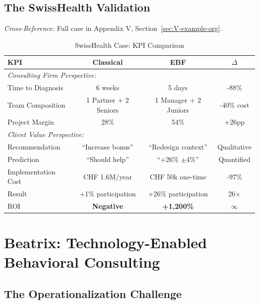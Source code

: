 \subsection{The SwissHealth Validation}

\textit{Cross-Reference:} Full case in Appendix V, Section~\ref{sec:V-example-org}.

\begin{table}[htbp]
\centering
\caption{SwissHealth Case: KPI Comparison}
\label{tab:swisshealth-kpis}
\renewcommand{\arraystretch}{1.3}
\begin{tabular}{@{}lccc@{}}
\toprule
\textbf{KPI} & \textbf{Classical} & \textbf{EBF} & \textbf{$\Delta$} \\
\midrule
\multicolumn{4}{l}{\textit{Consulting Firm Perspective:}} \\
Time to Diagnosis & 6 weeks & 5 days & -88\% \\
Team Composition & 1 Partner + 2 Seniors & 1 Manager + 2 Juniors & -40\% cost \\
Project Margin & 28\% & 54\% & +26pp \\
\midrule
\multicolumn{4}{l}{\textit{Client Value Perspective:}} \\
Recommendation & ``Increase bonus'' & ``Redesign context'' & Qualitative \\
Prediction & ``Should help'' & ``+26\% $\pm$4\%'' & Quantified \\
Implementation Cost & CHF 1.6M/year & CHF 50k one-time & -97\% \\
Result & +1\% participation & +26\% participation & 26$\times$ \\
ROI & \textbf{Negative} & \textbf{+1,200\%} & $\infty$ \\
\bottomrule
\end{tabular}
\end{table}



\section{Beatrix: Technology-Enabled Behavioral Consulting}
\label{sec:consulting-beatrix}

\subsection{The Operationalization Challenge}

